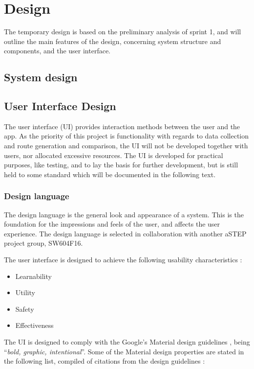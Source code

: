 \section{Design}
The temporary design is based on the preliminary analysis of sprint 1, and will outline the main features of the design, concerning system structure and components, and the user interface.

\subsection{System design}


\subsection{User Interface Design}
The user interface (UI) provides interaction methods between the user and the app.
As the priority of this project is functionality with regards to data collection and route generation and comparison, the UI will not be developed together with users, nor allocated excessive resources. 
The UI is developed for practical purposes, like testing, and to lay the basis for further development, but is still held to some standard which will be documented in the following text. 

\subsubsection{Design language}
The design language is the general look and appearance of a system.
This is the foundation for the impressions and feels of the user, and affects the user experience.
The design language is selected in collaboration with another aSTEP project group, SW604F16.

The user interface is designed to achieve the following usability characteristics \cite{DIS2014}:
\begin{itemize}
	\item Learnability
	\item Utility
	\item Safety
	\item Effectiveness
\end{itemize}

The UI is designed to comply with the Google's Material design guidelines \cite{materialDesign}, being ``\textit{bold, graphic, intentional}''. 
Some of the Material design properties are stated in the following list, compiled of citations from the design guidelines \cite{materialProperties}:

